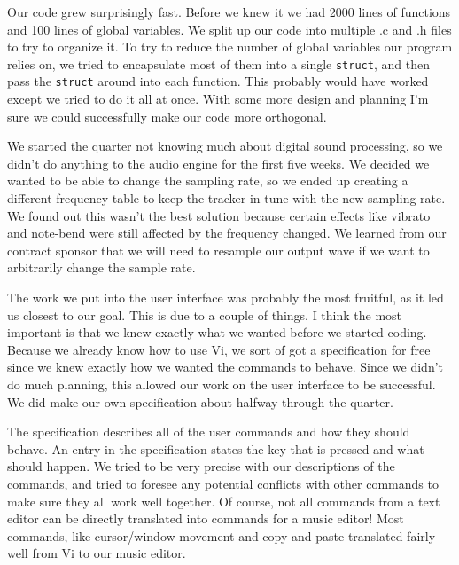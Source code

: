 \documentclass[12pt,letterpaper]{article}
\begin{document}
\par
Our code grew surprisingly fast. Before we knew it we had 2000 lines of functions and 100 lines of global variables. We split up our code into multiple .c and .h files to try to organize it. To try to reduce the number of global variables our program relies on, we tried to encapsulate most of them into a single {\tt struct}, and then pass the {\tt struct} around into each function. This probably would have worked except we tried to do it all at once. With some more design and planning I'm sure we could successfully make our code more orthogonal.

\par
We started the quarter not knowing much about digital sound processing, so we didn't do anything to the audio engine for the first five weeks. We decided we wanted to be able to change the sampling rate, so we ended up creating a different frequency table to keep the tracker in tune with the new sampling rate. We found out this wasn't the best solution because certain effects like vibrato and note-bend were still affected by the frequency changed. We learned from our contract sponsor that we will need to resample our output wave if we want to arbitrarily change the sample rate.


\par
The work we put into the user interface was probably the most fruitful, as it led us closest to our goal. This is due to a couple of things. I think the most important is that we knew exactly what we wanted before we started coding. Because we already know how to use Vi, we sort of got a specification for free since we knew exactly how we wanted the commands to behave. Since we didn't do much planning, this allowed our work on the user interface to be successful. We did make our own specification about halfway through the quarter.

\par
The specification describes all of the user commands and how they should behave. An entry in the specification states the key that is pressed and what should happen. We tried to be very precise with our descriptions of the commands, and tried to foresee any potential conflicts with other commands to make sure they all work well together. Of course, not all commands from a text editor can be directly translated into commands for a music editor! Most commands, like cursor/window movement and copy and paste translated fairly well from Vi to our music editor.
\end{document}
